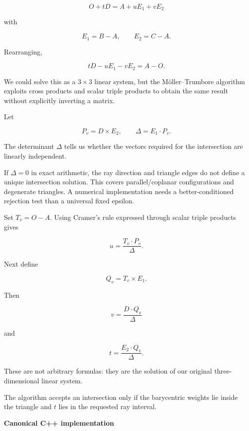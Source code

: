 \[
O+tD=A+uE_1+vE_2
\]

with

\[
E_1=B-A,\qquad E_2=C-A.
\]

Rearranging,

\[
tD-uE_1-vE_2=A-O.
\]

We could solve this as a \(3\times3\) linear system, but the Möller--Trumbore algorithm exploits cross products and scalar triple products to obtain the same result without explicitly inverting a matrix.

Let

\[
P_v=D\times E_2,\qquad \Delta=E_1\cdot P_v.
\]

The determinant \(\Delta\) tells us whether the vectors required for the intersection are linearly independent.

If \(\Delta=0\) in exact arithmetic, the ray direction and triangle edges do not define a unique intersection solution. This covers parallel/coplanar configurations and degenerate triangles. A numerical implementation needs a better-conditioned rejection test than a universal fixed epsilon.

Set \(T_v=O-A\). Using Cramer's rule expressed through scalar triple products gives

\[
u=\frac{T_v\cdot P_v}{\Delta}.
\]

Next define

\[
Q_v=T_v\times E_1.
\]

Then

\[
v=\frac{D\cdot Q_v}{\Delta}
\]

and

\[
t=\frac{E_2\cdot Q_v}{\Delta}.
\]

These are not arbitrary formulas: they are the solution of our original three-dimensional linear system.

The algorithm accepts an intersection only if the barycentric weights lie inside the triangle and \(t\) lies in the requested ray interval.

\textbf{Canonical C++ implementation}

